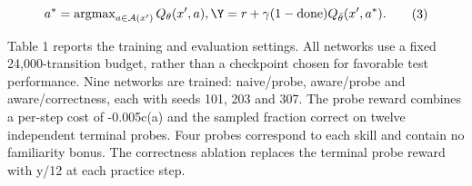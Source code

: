 \documentclass[preprint,11pt,authoryear]{elsarticle}
\begin{document}
\begin{equation}\begin{gathered}a^{*}=\operatorname{argmax}_{a\in\mathcal{A}(x^{\prime})}Q_{\theta}(x^{\prime},a),\Y=r+\gamma(1-\mathrm{done})Q_{\bar{\theta}}(x^{\prime},a^{*}).\end{gathered}\tag{3}\end{equation}

Table 1 reports the training and evaluation settings. All networks use a fixed 24,000-transition budget, rather than a checkpoint chosen for favorable test performance. Nine networks are trained: naive/probe, aware/probe and aware/correctness, each with seeds 101, 203 and 307. The probe reward combines a per-step cost of -0.005c(a) and the sampled fraction correct on twelve independent terminal probes. Four probes correspond to each skill and contain no familiarity bonus. The correctness ablation replaces the terminal probe reward with y/12 at each practice step.

\begingroup\small\setlength{\tabcolsep}{3pt}
\end{document}
